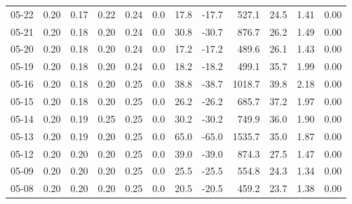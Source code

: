\begin{threeparttable}
{\begin{tabular}{lrrrrrrrrrrr}
  05-22 &          0.20 &          0.17 &          0.22 &        0.24 &                 0.0 &                17.8 &      -17.7 &               527.1 &             24.5 &            1.41 &                   0.00 \\
  05-21 &          0.20 &          0.18 &          0.20 &        0.24 &                 0.0 &                30.8 &      -30.7 &               876.7 &             26.2 &            1.49 &                   0.00 \\
  05-20 &          0.20 &          0.18 &          0.20 &        0.24 &                 0.0 &                17.2 &      -17.2 &               489.6 &             26.1 &            1.43 &                   0.00 \\
  05-19 &          0.20 &          0.18 &          0.20 &        0.24 &                 0.0 &                18.2 &      -18.2 &               499.1 &             35.7 &            1.99 &                   0.00 \\
  05-16 &          0.20 &          0.18 &          0.20 &        0.25 &                 0.0 &                38.8 &      -38.7 &              1018.7 &             39.8 &            2.18 &                   0.00 \\
  05-15 &          0.20 &          0.18 &          0.20 &        0.25 &                 0.0 &                26.2 &      -26.2 &               685.7 &             37.2 &            1.97 &                   0.00 \\
  05-14 &          0.20 &          0.19 &          0.25 &        0.25 &                 0.0 &                30.2 &      -30.2 &               749.9 &             36.0 &            1.90 &                   0.00 \\
  05-13 &          0.20 &          0.19 &          0.20 &        0.25 &                 0.0 &                65.0 &      -65.0 &              1535.7 &             35.0 &            1.87 &                   0.00 \\
  05-12 &          0.20 &          0.20 &          0.20 &        0.25 &                 0.0 &                39.0 &      -39.0 &               874.3 &             27.5 &            1.47 &                   0.00 \\
  05-09 &          0.20 &          0.20 &          0.20 &        0.25 &                 0.0 &                25.5 &      -25.5 &               554.8 &             24.3 &            1.34 &                   0.00 \\
  05-08 &          0.20 &          0.20 &          0.20 &        0.25 &                 0.0 &                20.5 &      -20.5 &               459.2 &             23.7 &            1.38 &                   0.00 \\

\end{tabular}}
\end{threeparttable}
